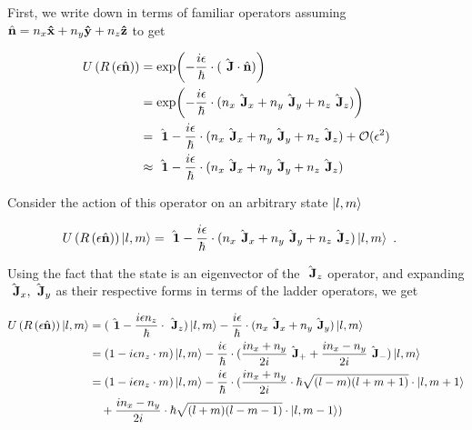 

First, we write down \Rotation{\epsilon}{\normalvector} in terms of familiar operators
assuming $\normalvector = n_x \vectorunit{x} + n_y \vectorunit{y} + n_z \vectorunit{z}$
to get

\begin{align}
    U\left(R\left(\epsilon \hat{\textbf{n}}\right)\right) &= \exp(-\frac{i\epsilon}{\hbar} \cdot (\hat{\textbf{~J}} \cdot \hat{\textbf{n}})) \nonumber \\
    &= \exp(-\frac{i\epsilon}{\hbar} \cdot (n_x \hat{\textbf{~J}}_x + n_y \hat{\textbf{~J}}_y + n_z \hat{\textbf{~J}}_z)) \\
    &= \hat{\textbf{~1}} - \frac{i\epsilon}{\hbar} \cdot (n_x \hat{\textbf{~J}}_x 
        + n_y \hat{\textbf{~J}}_y + n_z \hat{\textbf{~J}}_z) + \mathcal{O}(\epsilon^2) \nonumber \\
    &\approx \hat{\textbf{~1}} - \frac{i\epsilon}{\hbar} \cdot (n_x \hat{\textbf{~J}}_x 
    + n_y \hat{\textbf{~J}}_y + n_z \hat{\textbf{~J}}_z)
\end{align}

Consider the action of this operator on an arbitrary state $\ket{l, m}$

\begin{align}
    U\left(R\left(\epsilon \hat{\textbf{n}}\right)\right) \ket{l, m} &= \hat{\textbf{~1}} -\frac{i\epsilon}{\hbar} \cdot 
            (n_x \hat{\textbf{~J}}_x + n_y \hat{\textbf{~J}}_y + n_z \hat{\textbf{~J}}_z) \ket{l, m}~.
\end{align}

Using the fact that the state is an eigenvector of the $\hat{\textbf{~J}}_z$ operator, and expanding
$\hat{\textbf{~J}}_x, \hat{\textbf{~J}}_y$ as their respective forms in terms of the ladder operators,
we get

\begin{align}
    U\left(R\left(\epsilon \hat{\textbf{n}}\right)\right) \ket{l, m} &= (\hat{\textbf{~1}} -\frac{i\epsilon n_z}{\hbar} \cdot \hat{\textbf{~J}}_z)\ket{l, m}
            -\frac{i\epsilon}{\hbar} \cdot (n_x \hat{\textbf{~J}}_x + n_y \hat{\textbf{~J}}_y) \ket{l, m} \nonumber \\
    &= (1 - i\epsilon n_z \cdot m) \ket{l, m} -\frac{i\epsilon}{\hbar} 
            \cdot (\frac{i n_x + n_y}{2i} \hat{\textbf{~J}}_+ + \frac{i n_x - n_y}{2i} \hat{\textbf{~J}}_-) \ket{l, m} \nonumber \\
    &= (1 - i\epsilon n_z \cdot m) \ket{l, m} -\frac{i\epsilon}{\hbar} 
            \cdot (
              \frac{i n_x + n_y}{2i} \cdot \hbar\sqrt{(l-m)(l+m+1)} \cdot \ket{l, m + 1} \nonumber \\
    &\quad  + \frac{i n_x - n_y}{2i} \cdot \hbar\sqrt{(l+m)(l-m-1)} \cdot \ket{l, m - 1}
            )
\end{align}

